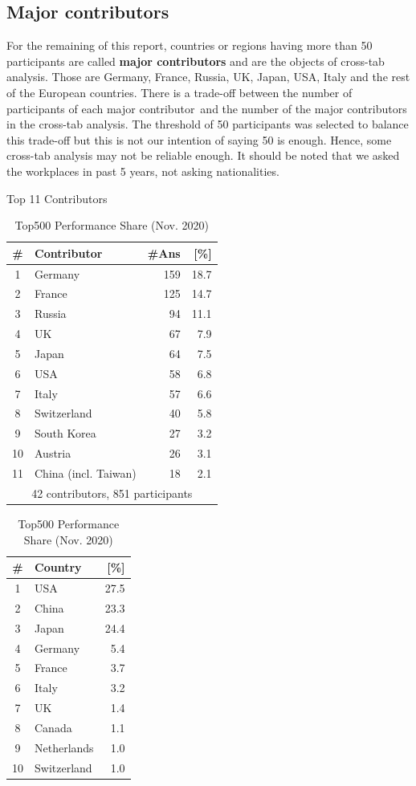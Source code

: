 \documentclass[preprint,5p,times]{elsarticle}
\def\Country{Contributor}%
\def\countries{contributors}%
\def\Countries{Contributors}%
\def\mcountry{major contributor}%
\begin{document}
\subsection*{Major contributors}

For the remaining of this report, countries or regions having more than 50
participants are called {\bf major contributors} and are the
objects of cross-tab analysis. Those are
Germany, France, Russia, UK, Japan, USA, Italy and
the rest of the European countries.
There is a trade-off between the number of participants of
each \mcountry\  and the number of the major contributors in the
cross-tab analysis. The 
threshold of 50 participants was selected to balance this trade-off
but this is not our intention of saying 50 is enough. Hence, some
cross-tab analysis may not be reliable enough.
It should be noted that we asked the
workplaces in past 5 years, not asking nationalities.
%
\begin{table}%
\begin{center}%
\caption{Top 11 \Countries}\label{tab:countries}%
\begin{tabular}{c|l|r|r}%
  \hline%
  \# & \Country & \#Ans & [\%] \\%
  \hline%
  1 & Germany 	& 159 & 18.7 \\%
  2 & France 	& 125 & 14.7 \\%
  3 & Russia 	& 94  & 11.1 \\%
  4 & UK 		& 67  &  7.9 \\%
  5 & Japan 	& 64  &  7.5 \\%
  6 & USA 	& 58  &  6.8 \\%
  7 & Italy 	& 57  &  6.6 \\%
  \hline%
  8 & Switzerland & 40  &  5.8 \\%
  9 & South Korea & 27  &  3.2 \\%
  10 & Austria 	& 26  &  3.1 \\%
  11 & China (incl. Taiwan) & 18 & 2.1 \\%
  \hline%
  \multicolumn{4}{c}{42 \countries, 851 participants} \\%
\end{tabular}%

\caption{Top500 Performance Share (Nov. 2020)}\label{tab:top500-share}%
  \begin{tabular}{c|l|r}%
    \hline%
    \# & Country & [\%] \\%
    \hline%
    1  & USA 	  & 27.5 \\%
    2  & China 	  & 23.3 \\%
    3  & Japan 	  & 24.4 \\%
    4  & Germany  &  5.4 \\%
    5  & France	  &  3.7 \\%
    6  & Italy	  &  3.2 \\%
    7  & UK	  &  1.4 \\%
    8  & Canada	  &  1.1 \\%
    9  & Netherlands  & 1.0 \\%
    10 & Switzerland  & 1.0 \\%
    \hline%
  \end{tabular}%
\end{center}%
\end{table}%
\end{document}
